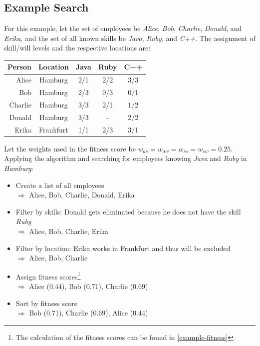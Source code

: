 \newpage
\subsection{Example Search}
For this example, let the set of employees be \textit{Alice}, \textit{Bob}, \textit{Charlie}, \textit{Donald}, and \textit{Erika}, and the set of all known skills be \textit{Java}, \textit{Ruby}, and \textit{C++}.
The assignment of skill/will levels and the respective locations are:
\newline
\begin{center}
\begin{tabular}{r|c|ccc}
  Person  & Location & Java & Ruby & C++ \\
  \hline
  Alice   & Hamburg   & 2/1 & 2/2 & 3/3 \\
  Bob     & Hamburg   & 2/3 & 0/3 & 0/1 \\
  Charlie & Hamburg   & 3/3 & 2/1 & 1/2 \\
  Donald  & Hamburg   & 3/3 &  -  & 2/2 \\
  Erika   & Frankfurt & 1/1 & 2/3 & 3/1 \\
\end{tabular}
\end{center}

Let the weights used in the fitness score be $w_{as} = w_{aw} = w_{ss} = w_{sw} = 0.25$.
Applying the algorithm and searching for employees knowing \textit{Java} and \textit{Ruby} in \textit{Hamburg}:\\

\begin{itemize}
  \item Create a list of all employees\\
    $\Rightarrow$ Alice, Bob, Charlie, Donald, Erika
  \item Filter by skills: Donald gets eliminated because he does not have the skill \textit{Ruby}\\
    $\Rightarrow$ Alice, Bob, Charlie, Erika
  \item Filter by location: Erika works in Frankfurt and thus will be excluded\\
    $\Rightarrow$ Alice, Bob, Charlie
  \item Assign fitness scores\footnote{The calculation of the fitness scores can be found in \ref{example-fitness}}\\
    $\Rightarrow$ Alice (0.44), Bob (0.71), Charlie (0.69)
  \item Sort by fitness score\\
    $\Rightarrow$ Bob (0.71), Charlie (0.69), Alice (0.44)
\end{itemize}



